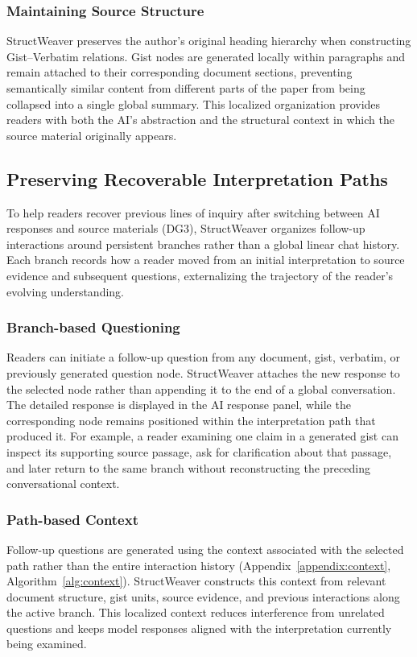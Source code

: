 \documentclass[manuscript,review,anonymous]{acmart}
\begin{document}
\subsubsection{Maintaining Source Structure}
StructWeaver preserves the author's original heading hierarchy when constructing Gist--Verbatim relations. Gist nodes are generated locally within paragraphs and remain attached to their corresponding document sections, preventing semantically similar content from different parts of the paper from being collapsed into a single global summary. This localized organization provides readers with both the AI's abstraction and the structural context in which the source material originally appears.

\subsection{Preserving Recoverable Interpretation Paths}
\label{sec:interpretation-paths}

To help readers recover previous lines of inquiry after switching between AI responses and source materials (DG3), StructWeaver organizes follow-up interactions around persistent branches rather than a global linear chat history. Each branch records how a reader moved from an initial interpretation to source evidence and subsequent questions, externalizing the trajectory of the reader's evolving understanding.

\subsubsection{Branch-based Questioning}
Readers can initiate a follow-up question from any document, gist, verbatim, or previously generated question node. StructWeaver attaches the new response to the selected node rather than appending it to the end of a global conversation. The detailed response is displayed in the AI response panel, while the corresponding node remains positioned within the interpretation path that produced it. For example, a reader examining one claim in a generated gist can inspect its supporting source passage, ask for clarification about that passage, and later return to the same branch without reconstructing the preceding conversational context.

\subsubsection{Path-based Context}
Follow-up questions are generated using the context associated with the selected path rather than the entire interaction history (Appendix~\ref{appendix:context}, Algorithm~\ref{alg:context}). StructWeaver constructs this context from relevant document structure, gist units, source evidence, and previous interactions along the active branch. This localized context reduces interference from unrelated questions and keeps model responses aligned with the interpretation currently being examined.
\end{document}
